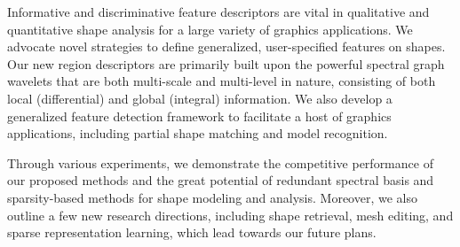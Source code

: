 Informative and discriminative feature descriptors are vital in
qualitative and quantitative shape analysis for a large variety of
graphics applications. We advocate novel strategies to define generalized,
user-specified features on shapes. Our new region descriptors
are primarily built upon the powerful spectral graph wavelets that
are both multi-scale and multi-level in nature, consisting of both local (differential) and
global (integral) information. We also develop a generalized feature detection framework
to facilitate a host of graphics applications, including partial shape matching
and model recognition.

Through various experiments, we demonstrate the competitive performance of our proposed methods and the
great potential of redundant spectral basis and sparsity-based methods for shape modeling and analysis.
Moreover, we also outline a few new research directions, including shape retrieval, mesh editing, and
sparse representation learning, which lead towards our future plans. 